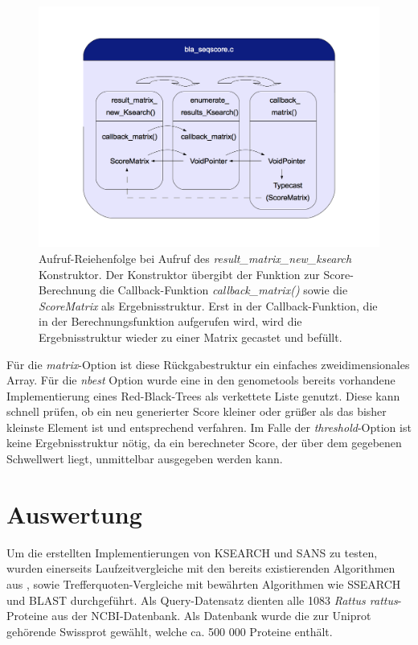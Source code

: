 \documentclass{article}
\begin{document}
\begin{center}
  \begin{figure}
    \includegraphics[width = \linewidth]{img/dia3}
    \caption{Aufruf-Reiehenfolge bei Aufruf des \emph{result\_matrix\_new\_ksearch} Konstruktor. Der Konstruktor übergibt der Funktion zur Score-Berechnung
      die Callback-Funktion \emph{callback\_matrix()} sowie die \emph{ScoreMatrix} als Ergebnisstruktur. Erst in der Callback-Funktion, die in der 
      Berechnungsfunktion aufgerufen wird, wird die Ergebnisstruktur wieder zu einer Matrix gecastet und befüllt.}
    \label{kscallback}
  \end{figure}
\end{center}

Für die \emph{matrix}-Option ist diese Rückgabestruktur ein einfaches zweidimensionales Array. Für die \emph{nbest} Option wurde eine in den genometools
bereits vorhandene Implementierung eines Red-Black-Trees als verkettete Liste genutzt. Diese kann schnell prüfen, ob ein neu generierter Score kleiner oder
grüßer als das bisher kleinste Element ist und entsprechend verfahren. Im Falle der \emph{threshold}-Option ist keine Ergebnisstruktur nötig,
da ein berechneter Score, der über dem gegebenen Schwellwert liegt, unmittelbar ausgegeben werden kann.

\section{Auswertung}

Um die erstellten Implementierungen von KSEARCH und SANS zu testen, wurden einerseits Laufzeitvergleiche mit den bereits existierenden Algorithmen aus \cite{Holm}, sowie Trefferquoten-Vergleiche mit bewährten Algorithmen wie SSEARCH und BLAST durchgeführt. Als Query-Datensatz dienten alle 1083 \textit{Rattus rattus}-Proteine aus der NCBI-Datenbank. Als Datenbank wurde die zur Uniprot gehörende Swissprot gewählt, welche ca. 500 000 Proteine enthält.
\end{document}
